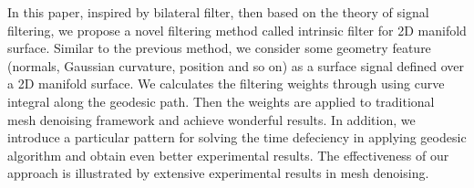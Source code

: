 In this paper, inspired by bilateral filter, then based on the theory of signal filtering, we propose a novel filtering method called intrinsic filter for 2D manifold surface.
Similar to the previous method, we consider some geometry feature (normals, Gaussian curvature, position and so on) as a surface signal defined over a 2D manifold surface.
We calculates the filtering weights through using curve integral along the geodesic path.
Then the weights are applied to traditional mesh denoising framework and achieve wonderful results.
In addition, we introduce a particular pattern for solving the time defeciency in applying geodesic algorithm and obtain even better experimental results.
The effectiveness of our approach is illustrated by extensive experimental results in mesh denoising.

